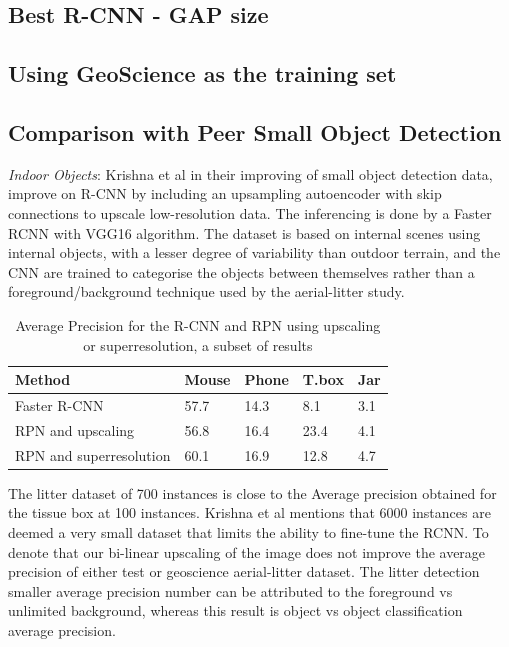 \documentclass{IEEEtran}
\begin{document}
\subsection{Best R-CNN - GAP size}

\subsection{Using GeoScience as the training set}


\subsection{Comparison with Peer Small Object Detection}

\textit{Indoor Objects}: Krishna et al \cite{Krishna} in their improving of small object detection data, improve on R-CNN by including an upsampling autoencoder with skip connections to upscale low-resolution data. The inferencing is done by a Faster RCNN with VGG16 algorithm. The dataset is based on internal scenes using internal objects, with a lesser degree of variability than outdoor terrain, and the CNN are trained to categorise the objects between themselves rather than a foreground/background technique used by the aerial-litter study.

\begin{table}[h]
\caption{Average Precision for the R-CNN and RPN using upscaling or superresolution, a subset of results}
\centering
\begin{tabular}{lllll}
\hline
\textbf{Method}                         & \textbf{Mouse}            & \textbf{Phone}            & \textbf{T.box}            & \textbf{Jar}             \\ \hline
\multicolumn{1}{|l|}{Faster R-CNN}      & \multicolumn{1}{l|}{57.7} & \multicolumn{1}{l|}{14.3} & \multicolumn{1}{l|}{8.1}  & \multicolumn{1}{l|}{3.1} \\ \hline
\multicolumn{1}{|l|}{RPN and upscaling} & \multicolumn{1}{l|}{56.8} & \multicolumn{1}{l|}{16.4} & \multicolumn{1}{l|}{23.4} & \multicolumn{1}{l|}{4.1} \\ \hline
RPN and superresolution                 & 60.1                      & 16.9                      & 12.8                      & 4.7                      \\ \hline
\end{tabular}
\end{table}

The litter dataset of 700 instances is close to the Average precision obtained for the tissue box at 100 instances. Krishna et al \cite{Krishna} mentions that 6000 instances are deemed a very small dataset that limits the ability to fine-tune the RCNN. To denote that our bi-linear upscaling of the image does not improve the average precision of either test or geoscience aerial-litter dataset. The litter detection smaller average precision number can be attributed to the foreground vs unlimited background, whereas this result is object vs object classification average precision.\newline
\end{document}
